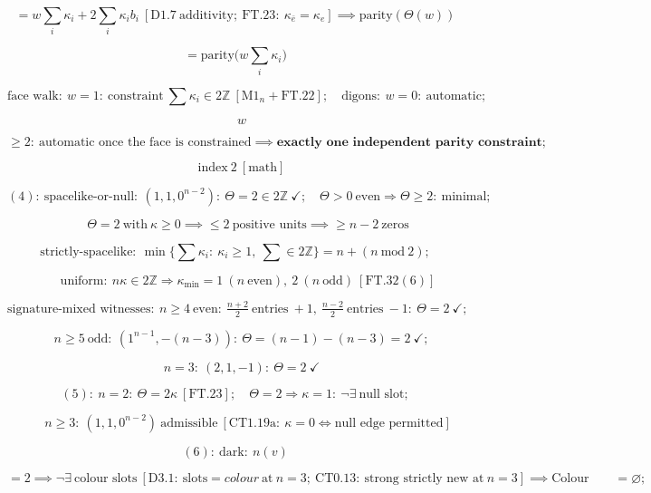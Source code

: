 \begin{theorem}
\[
= w\sum_i\kappa_i+2\sum_i\kappa_ib_i\ [\mathrm{D1.7}\ \text{additivity};\ \mathrm{FT.23}:\ \kappa_{\bar e}=\kappa_e]\implies\text{parity}(\Theta(w))
\]

\[
= \text{parity}\bigl(w\textstyle\sum_i\kappa_i\bigr)
\]

\[
\text{face walk}:\ w=1:\ \text{constraint}\ \textstyle\sum\kappa_i\in2\mathbb Z\ [\mathrm{M1}_n+\mathrm{FT.22}];\quad\text{digons}:\ w=0:\ \text{automatic};
\]

\[
\quad w
\]

\[
\ge 2:\ \text{automatic once the face is constrained}\implies\textbf{exactly one independent parity constraint};
\]

\[
\quad\text{index}\ 2\ [\text{math}]
\]

\[
(4):\ \text{spacelike-or-null}:\ (1,1,0^{n-2}):\ \Theta=2\in2\mathbb Z\ \checkmark;\quad\Theta>0\ \text{even}\Rightarrow\Theta\ge2:\ \text{minimal};
\]

\[
\qquad \Theta=2\ \text{with}\ \kappa\ge0\implies\le2\ \text{positive units}\implies\ge n{-}2\ \text{zeros}
\]

\[
\text{strictly-spacelike}:\ \min\{\textstyle\sum\kappa_i:\ \kappa_i\ge1,\ \sum\in2\mathbb Z\}=n+(n\ \mathrm{mod}\ 2);
\]

\[
\qquad \text{uniform}:\ n\kappa\in2\mathbb Z\Rightarrow\kappa_{\min}=1\ (n\ \text{even}),\ 2\ (n\ \text{odd})\ [\mathrm{FT.32}(6)]
\]

\[
\text{signature-mixed witnesses}:\ n\ge4\ \text{even}:\ \tfrac{n+2}{2}\ \text{entries}\ {+}1,\ \tfrac{n-2}{2}\ \text{entries}\ {-}1:\ \Theta=2\ \checkmark;
\]

\[
\quad n\ge5\ \text{odd}:\ (1^{n-1},-(n-3)):\ \Theta=(n-1)-(n-3)=2\ \checkmark;
\]

\[
\quad n=3:\ (2,1,-1):\ \Theta=2\ \checkmark
\]

\[
(5):\ n=2:\ \Theta=2\kappa\ [\mathrm{FT.23}];\quad\Theta=2\Rightarrow\kappa=1:\ \neg\exists\ \text{null slot};
\]

\[
\qquad n\ge3:\ (1,1,0^{n-2})\ \text{admissible}\ [\mathrm{CT1.19a}:\ \kappa=0\iff\text{null edge permitted}]
\]

\[
(6):\ \text{dark}:\ n(v)
\]

\[
= 2\implies\neg\exists\ \text{colour slots}\ [\mathrm{D3.1}:\ \text{slots}=colour\ \text{at}\ n{=}3;\ \mathrm{CT0.13}:\ \text{strong strictly new at}\ n{=}3]\implies\mathrm{Colour}\qquad = \varnothing;
\]


\end{theorem}
